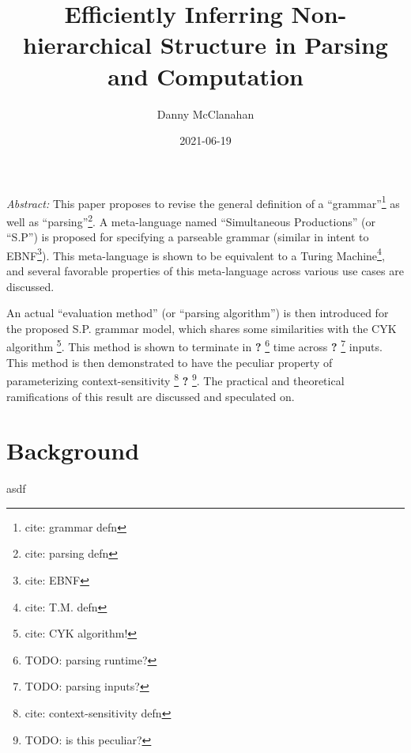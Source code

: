 \documentclass[10pt]{article}
\title{Efficiently Inferring Non-hierarchical Structure in Parsing and Computation}
\date{2021-06-19}
\author{Danny McClanahan}
\newcommand{\todocite}[1]{\footnote{cite: #1}}
\newcommand{\todo}[1]{\textbf{?} \footnote{TODO: #1}}
\begin{document}
\maketitle

\textit{Abstract:} This paper proposes to revise the general definition of a ``grammar''\todocite{grammar defn} as well as ``parsing''\todocite{parsing defn}. A meta-language named ``Simultaneous Productions'' (or ``S.P'') is proposed for specifying a parseable grammar (similar in intent to EBNF\todocite{EBNF}). This meta-language is shown to be equivalent to a Turing Machine\todocite{T.M. defn}, and several favorable properties of this meta-language across various use cases are discussed.

An actual ``evaluation method'' (or ``parsing algorithm'') is then introduced for the proposed S.P. grammar model, which shares some similarities with the CYK algorithm \todocite{CYK algorithm!}. This method is shown to terminate in \todo{parsing runtime?} time across \todo{parsing inputs?} inputs. This method is then demonstrated to have the peculiar property of parameterizing context-sensitivity \todocite{context-sensitivity defn} \todo{is this peculiar?}. The practical and theoretical ramifications of this result are discussed and speculated on.

\tableofcontents

\section{Background}
\label{sec:background}

asdf
\end{document}
